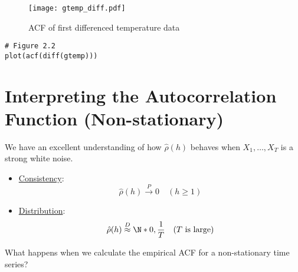\begin{figure}[!ht]
    \centering
    \texttt{[image: gtemp\_diff.pdf]}
    \caption{ACF of first differenced temperature data}\label{fig:gtemp_diff}
\end{figure}
\begin{verbatim}
# Figure 2.2
plot(acf(diff(gtemp)))
\end{verbatim}

\section{Interpreting the Autocorrelation Function (Non-stationary)}
We have an excellent understanding of how $ \hat{\rho}(h) $
behaves when $ X_1,\ldots,X_T $ is a strong white noise.
\begin{itemize}
    \item \underline{Consistency}:
          \[ \hat{\rho}(h)\stackrel{P}{\to}0\quad(h\ge 1) \]
    \item \underline{Distribution}:
          \[ \hat{\rho}(h)\stackrel{D}{\approx}\N*{0,\frac{1}{T} }\quad (T\text{ is large}) \]
\end{itemize}
What happens when we calculate the empirical ACF for a non-stationary time
series?

